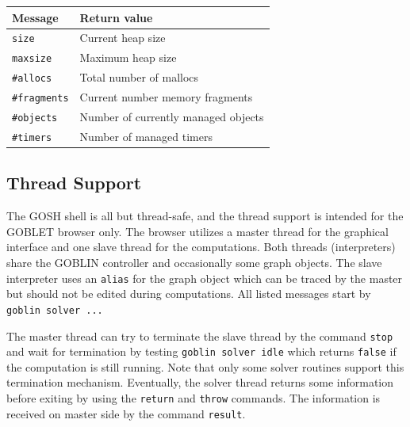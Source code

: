 \documentclass[a4paper,11pt,twoside]{book}
\begin{document}
\bigskip
\begin{center}
\begin{tabular}{|p{4.3cm}|p{11cm}|}
\hline
{\bf Message}       & {\bf Return value} \\
\hline
\hline
\verb/size/         & Current heap size \\
\hline
\verb/maxsize/      & Maximum heap size \\
\hline
\verb/#allocs/      & Total number of mallocs \\
\hline
\verb/#fragments/   & Current number memory fragments \\
\hline
\verb/#objects/     & Number of currently managed objects \\
\hline
\verb/#timers/      & Number of managed timers \\
\hline
\end{tabular}
\end{center}
\bigskip


\subsection{Thread Support}
\label{slb_thread_support}
The GOSH shell is all but thread-safe, and the thread support is intended for
the GOBLET browser only. The browser utilizes a master thread for the graphical
interface and one slave thread for the computations. Both threads (interpreters)
share the GOBLIN controller and occasionally some graph objects.
The slave interpreter uses an \verb/alias/ for the graph object which can be
traced by the master but should not be edited during computations. All listed
messages start by \verb/goblin solver .../

The master thread can try to terminate the slave thread by the command
\verb/stop/ and wait for termination by testing \verb/goblin solver idle/
which returns \verb/false/ if the computation is still running. Note that only
some solver routines support this termination mechanism. Eventually, the solver
thread returns some information before exiting by using the \verb/return/ and
\verb/throw/ commands. The information is received on master side by the
command \verb/result/.
\end{document}
